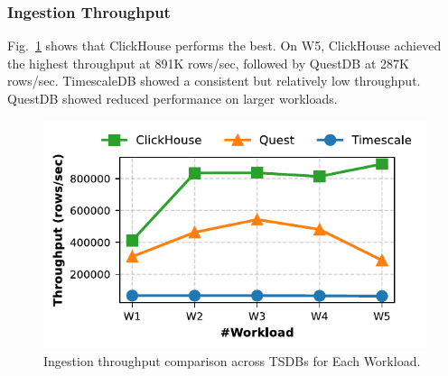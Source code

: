 \documentclass[conference]{IEEEtran}
\begin{document}
\subsubsection{Ingestion Throughput}
Fig.~\ref{fig:ingestion_throughput_comparison} shows that ClickHouse performs the best. On W5, ClickHouse achieved the highest throughput at 891K rows/sec, followed by QuestDB at 287K rows/sec. TimescaleDB showed a consistent but relatively low throughput. QuestDB showed reduced performance on larger workloads.
\begin{figure}[tb]
\centering
\includegraphics[width=0.8\linewidth]{2_ing_throughput_plot.pdf}
\caption{Ingestion throughput comparison across TSDBs for Each Workload.}
\label{fig:ingestion_throughput_comparison}
\end{figure}
\end{document}
